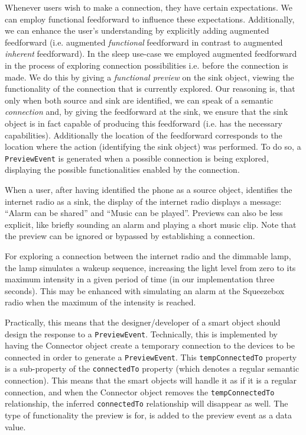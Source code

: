 Whenever users wish to make a connection, they have certain expectations. We can employ functional feedforward to influence these expectations. Additionally, we can enhance the user's understanding by explicitly adding augmented feedforward (i.e. augmented \emph{functional} feedforward in contrast to augmented \emph{inherent} feedforward). In the sleep use-case we employed augmented feedforward in the process of exploring connection possibilities i.e. before the connection is made. We do this by giving a \emph{functional preview} on the sink object, viewing the functionality of the connection that is currently explored. Our reasoning is, that only when both source and sink are identified, we can speak of a semantic \emph{connection} and, by giving the feedforward at the sink, we ensure that the sink object is in fact capable of producing this feedforward (i.e. has the necessary capabilities). Additionally the location of the feedforward corresponds to the location where the action (identifying the sink object) was performed. To do so, a \texttt{PreviewEvent} is generated  when a possible connection is being explored, displaying the possible functionalities enabled by the connection.

\begin{example}
\label{phoneToSqueezebox}
When a user, after having identified the phone as a source object, identifies the internet radio as a sink, the display of the internet radio displays a message: ``Alarm can be shared'' and ``Music can be played''. Previews can also be less explicit, like briefly sounding an alarm and playing a short music clip. Note that the preview can be ignored or bypassed by establishing a connection.
\end{example}

\begin{example}
\label{squeezeboxToLamp}
For exploring a connection between the internet radio and the dimmable lamp, the lamp simulates a wakeup sequence, increasing the light level from zero to its maximum intensity in a given period of time (in our implementation three seconds). This may be enhanced with simulating an alarm at the Squeezebox radio when the maximum of the intensity is reached. 
\end{example}

Practically, this means that the designer/developer of a smart object should design the response to  a \texttt{PreviewEvent}. Technically, this is implemented by having the Connector object create a temporary connection to the devices to be connected in order to generate a \texttt{PreviewEvent}. This \texttt{tempConnectedTo} property is a sub-property of the \texttt{connectedTo} property (which denotes a regular semantic connection). This means that the smart objects will handle it as if it is a regular connection, and when the Connector object removes the \texttt{tempConnectedTo} relationship, the inferred \texttt{connectedTo} relationship will disappear as well. The type of functionality the preview is for, is added to the preview event as a data value.

